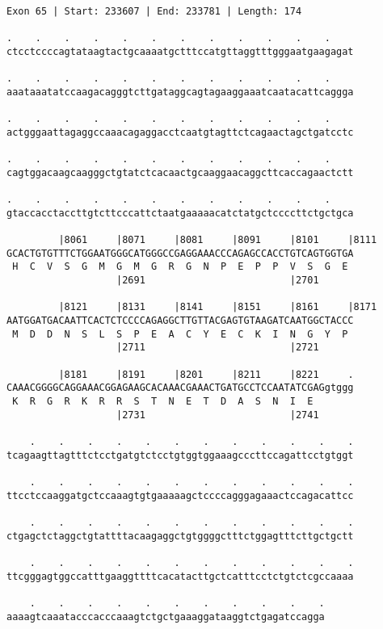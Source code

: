 \documentclass{article}
\begin{document}
\newpage
\begin{Verbatim}
Exon 65 | Start: 233607 | End: 233781 | Length: 174
 
.    .    .    .    .    .    .    .    .    .    .    .    
ctcctccccagtataagtactgcaaaatgctttccatgttaggtttgggaatgaagagat
  
.    .    .    .    .    .    .    .    .    .    .    .    
aaataaatatccaagacagggtcttgataggcagtagaaggaaatcaatacattcaggga
  
.    .    .    .    .    .    .    .    .    .    .    .    
actgggaattagaggccaaacagaggacctcaatgtagttctcagaactagctgatcctc
  
.    .    .    .    .    .    .    .    .    .    .    .    
cagtggacaagcaagggctgtatctcacaactgcaaggaacaggcttcaccagaactctt
  
.    .    .    .    .    .    .    .    .    .    .    .    
gtaccacctaccttgtcttcccattctaatgaaaaacatctatgctccccttctgctgca
  
         |8061     |8071     |8081     |8091     |8101     |8111
GCACTGTGTTTCTGGAATGGGCATGGGCCGAGGAAACCCAGAGCCACCTGTCAGTGGTGA
 H  C  V  S  G  M  G  M  G  R  G  N  P  E  P  P  V  S  G  E 
                   |2691                         |2701      
  
         |8121     |8131     |8141     |8151     |8161     |8171
AATGGATGACAATTCACTCTCCCCAGAGGCTTGTTACGAGTGTAAGATCAATGGCTACCC
 M  D  D  N  S  L  S  P  E  A  C  Y  E  C  K  I  N  G  Y  P 
                   |2711                         |2721      
  
         |8181     |8191     |8201     |8211     |8221     .
CAAACGGGGCAGGAAACGGAGAAGCACAAACGAAACTGATGCCTCCAATATCGAGgtggg
 K  R  G  R  K  R  R  S  T  N  E  T  D  A  S  N  I  E       
                   |2731                         |2741      
  
    .    .    .    .    .    .    .    .    .    .    .    .
tcagaagttagtttctcctgatgtctcctgtggtggaaagcccttccagattcctgtggt
  
    .    .    .    .    .    .    .    .    .    .    .    .
ttcctccaaggatgctccaaagtgtgaaaaagctccccagggagaaactccagacattcc
  
    .    .    .    .    .    .    .    .    .    .    .    .
ctgagctctaggctgtattttacaagaggctgtggggctttctggagtttcttgctgctt
  
    .    .    .    .    .    .    .    .    .    .    .    .
ttcgggagtggccatttgaaggttttcacatacttgctcatttcctctgtctcgccaaaa
  
    .    .    .    .    .    .    .    .    .    .    .
aaaagtcaaatacccacccaaagtctgctgaaaggataaggtctgagatccagga
\end{Verbatim}
\end{document}
